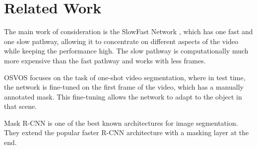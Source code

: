 \section{Related Work}
The main work of consideration is the SlowFast Network \cite{slow_fast}, which has one fast and one slow pathway, allowing it to concentrate on different aspects of the video while keeping the performance high. The slow pathway is computationally much more expensive than the fast pathway and works with less frames.

OSVOS \cite{osvos} focuses on the task of one-shot video segmentation, where in test time, the network is fine-tuned on the first frame of the video, which has a manually annotated mask. This fine-tuning allows the network to adapt to the object in that scene.

Mask R-CNN \cite{mask_rcnn} is one of the best known architectures for image segmentation. They extend the popular faster R-CNN architecture with a masking layer at the end.